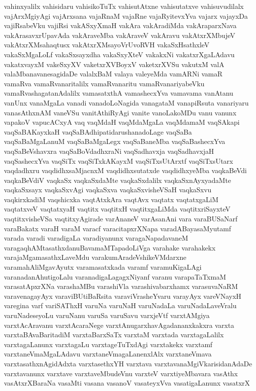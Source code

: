 {vahinxyalilx
vahisidaru
vahisikoTuTx
vahisutAtxne
vahisutatxve
vahisuvudilalx
vajArxMgiyAgi
vajArxsana
vajaRnaM
vajaRne
vajaRyitevxYva
vajarx
vajayxDa
vajiRsabeVku
vajiRsi
vakASxyXmaH
vakAra
vakAradiMda
vakAraparxNava
vakArasavxrUpavAda
vakAraveMba
vakAraveV
vakAravu
vakAtxrXMbujeV
vakAtxrXMsahaqtusx
vakAtxrXMsayoVrUvoRVH
vakaSxHsathxleV
vakaSxMgaLoLf
vakaSxsayxdha
vakaSxyXteV
vakakxNi
vakatxrXgaLAdavu
vakatxvayxM
vakeSxyXV
vaketxrXVBoyxV
vaketxrXVSu
vakutxM
valA
valaMbanavanesagidaDe
valalxBaM
valaya
valeyeMda
vamARNi
vamaR
vamaRva
vamaRvanaritalilx
vamaRvanaritu
vamaRvanariyabeVku
vamaRvashagatanAdalilx
vamasatxthA
vamashecxYva
vamavama
vanAtanu
vanUnx
vanaMgaLa
vanadi
vanadoLoNagida
vanagataM
vanapiRsuta
vanariyaru
vanasAthxnAM
vaneVSu
vanitAthiRyAgi
vanite
vanoLakoMDu
vanu
vanunx
vapakoV
vapucACxyA
vaq
vaqMdaH
vaqMdaMgaLa
vaqMdamaM
vaqSAkapi
vaqSaBAKayxkaH
vaqSaBAdhipatidarushanadoLage
vaqSaBa
vaqSaBaMgaLanuM
vaqSaBaMgaLegx
vaqSaBaneMba
vaqSaBashecxYva
vaqSaBeVshavxra
vaqSaBoVdadhxraNi
vaqSadhavxja
vaqSadhavxjaH
vaqSashecxYva
vaqSiTx
vaqSiTxkAKayxM
vaqSiTxsUtArxtf
vaqSiTxsUtarx
vaqdadhxru
vaqdidhxsaMjacnxM
vaqdidhxsutatxde
vaqdidhxyeMba
vaqkaBeVdi
vaqkaBeVdiV
vaqkaSx
vaqkaSxdaMte
vaqkaSxdalilx
vaqkaSxnAyxyadaMte
vaqkaSxsayx
vaqkaSxvAgi
vaqkaSxva
vaqkaSxvisheVSaH
vaqkaSxvu
vaqkirxkadiM
vaqshicxka
vaqtAtxkAra
vaqtAvx
vaqtatx
vaqtatxgaLiM
vaqtatxveV
vaqtatxyaH
vaqtitx
vaqtitxH
vaqtitxgaLiMda
vaqtitxriSayxteV
vaqtitxvisheVSa
vaqtitxyAgirade
varAnaneV
varAsanAni
vara
varaBUSaNarf
varaBakatx
varaH
varaM
varacf
varacitapxrXNapa
varadABayasaMyutamf
varada
varadi
varadigaLa
varadiyanunx
varagaNapadavaneM
varagaqhAMtasathxdanuBavamaMTapadoLiVga
varahake
varahakekx
varajaMgamasathxLaveMdu
varakumAradeVshikeVMdarxne
varamahAliMgavAyutx
varamasatxkada
varamf
varamuKigaLAgi
varanadanAhutigoLalu
varanadigaLagagxNiyanf
varanu
varapaTaTxmaM
varasatApxrXNa
varashaMBu
varashiVla
varashivabarxhamx
varasuvaNaRM
varavenagayAyx
varaviBUtiBaRsita
varaviVrasheYvaru
varayAyx
vareVNayxH
varegina
varf
variSAThxH
varuNa
varuNaH
varuNadaLa
varuNadaLaveVralu
varuNadeseyoLu
varuNanu
varuSa
varuSavu
varxjeVtf
varxtAMgiya
varxtAcAravanu
varxtAcaraNege
varxtAnugarxhavAgadananxkakxra
varxta
varxtaBAvaBaritadiM
varxtaBarxSaTx
varxtaM
varxtada
varxtagaLalilx
varxtagaLanunx
varxtagaLu
varxtageTuTxdAgi
varxtakekx
varxtamf
varxtaneVmaMgaLAdavu
varxtaneVmagaLanenxlAlx
varxtaneVmava
varxtasathxnAgidAdxta
varxtasethxYH
varxtava
varxtavanaMgiVkarisidanAdaDe
varxtavanunx
varxtave
varxtaveMbudeVnu
varxteV
varxtiyeMbavara
vasAthx
vasAtxrXBaraNa
vasaMti
vasana
vasanoV
vasateyxVva
vasatigaLanunx
vasatxrX
}
